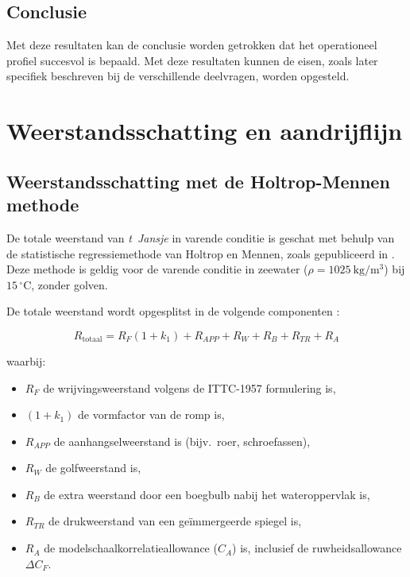\section{Conclusie}

Met deze resultaten kan de conclusie worden getrokken dat het operationeel profiel succesvol is bepaald. Met deze resultaten kunnen de eisen, zoals later specifiek beschreven bij de verschillende deelvragen, worden opgesteld.
 
\chapter{Weerstandsschatting en aandrijflijn}
\label{ch:holtrop-aandrijflijn}
 
\section{Weerstandsschatting met de Holtrop-Mennen methode}
\label{sec:holtrop}
 
De totale weerstand van \emph{t~Jansje} in varende conditie is geschat met behulp van de
statistische regressiemethode van Holtrop en Mennen, zoals gepubliceerd in
\cite{Holtrop1984}. Deze methode is geldig voor de varende conditie in zeewater
($\rho = 1025\ \mathrm{kg/m^3}$) bij $15\,^{\circ}\mathrm{C}$, zonder golven.
 
De totale weerstand wordt opgesplitst in de volgende componenten \cite{Holtrop1984}:
 
\begin{equation}
    R_\mathrm{totaal} = R_F(1+k_1) + R_{APP} + R_W + R_B + R_{TR} + R_A
    \label{eq:Rtot}
\end{equation}
 
\noindent waarbij:
\begin{itemize}
    \item $R_F$ de wrijvingsweerstand volgens de ITTC-1957 formulering is,
    \item $(1+k_1)$ de vormfactor van de romp is,
    \item $R_{APP}$ de aanhangselweerstand is (bijv.\ roer, schroefassen),
    \item $R_W$ de golfweerstand is,
    \item $R_B$ de extra weerstand door een boegbulb nabij het wateroppervlak is,
    \item $R_{TR}$ de drukweerstand van een geïmmergeerde spiegel is,
    \item $R_A$ de modelschaalkorrelatieallowance ($C_A$) is, inclusief de
          ruwheidsallowance $\Delta C_F$.
\end{itemize}
 
